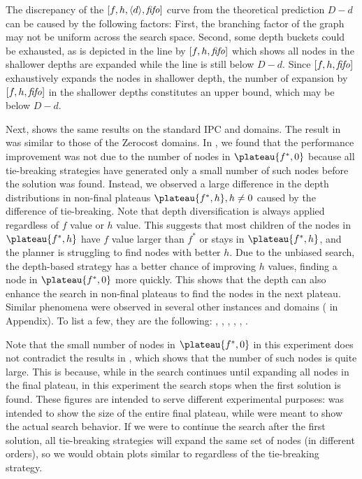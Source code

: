 The discrepancy of the $[f,h,{\left<d\right>},{\text{\textit{fifo}}}]$ curve from the theoretical prediction $D-d$ can be caused by the 
following factors: First, the branching factor of the graph may not be
uniform across the search space. Second, some depth buckets could be
exhausted, as is depicted in the line by $[f,h,{\text{\textit{fifo}}}]$ which
shows all nodes in the shallower depths are expanded while the line is still below $D-d$.
Since $[f,h,{\text{\textit{fifo}}}]$ exhaustively expands the nodes in shallower depth,
the number of expansion by $[f,h,{\text{\textit{fifo}}}]$ in the shallower depths constitutes an upper bound, which may be below $D-d$.

Next,  shows the same results on the standard IPC
 and  domains.
The result in  was similar to those of the Zerocost domains.
In ,
we found that the performance improvement was not due to the number of nodes in $\plateau{f^*,0}$ because all tie-breaking strategies have generated only a small number of such nodes before the solution was found.
Instead, we observed a large difference in the depth distributions in non-final plateaus $\plateau{f^*,h}, h\not=0$ caused by the difference of tie-breaking.
Note that depth diversification is always applied regardless of $f$ value or $h$ value.
This suggests that most children of the nodes in $\plateau{f^*,h}$ have $f$ value larger than $f^*$ or stays in $\plateau{f^*,h}$, and the planner is struggling to find nodes with better $h$.
Due to the unbiased search, the depth-based strategy has a better chance of improving $h$ values, finding a node in $\plateau{f^*,0}$ more quickly.
This shows that the depth can also enhance the search in non-final plateaus to find the nodes in the next plateau.
Similar phenomena were observed in several other instances and domains ( in Appendix). To list a few, they are the following: , , , , , .

Note that the small number of nodes in $\plateau{f^*,0}$ in this experiment does not contradict the results in ,  which shows that  the number of such nodes is quite large.
This is because, while in  the search continues until expanding all nodes in the final plateau, in this experiment the search stops when the first solution is found. These figures are intended to serve different experimental purposes:  was intended to show the size of the entire final plateau, while  were meant to show the actual search behavior. If we were to continue the search after the first solution, all tie-breaking strategies will expand the same set of nodes (in different orders), so we would obtain plots similar to  regardless of the tie-breaking strategy.

